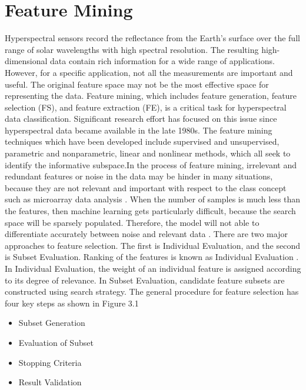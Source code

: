 \documentclass[document.tex]{subfiles}
\begin{document}
\section{Feature Mining}
Hyperspectral sensors record the reflectance from the Earth's surface over the full range of solar wavelengths with high spectral resolution. The resulting high-dimensional data contain rich information for a wide range of applications. However, for a specific application, not all the measurements are important and useful. The original feature space may not be the most effective space for representing the data. Feature mining, which includes feature generation, feature selection (FS), and feature extraction (FE)\cite{5}, is a critical task for hyperspectral data classification. Significant research effort has focused on this issue since hyperspectral data became available in the late 1980s. The feature mining techniques which have been developed include supervised and unsupervised, parametric and nonparametric, linear and nonlinear methods, which all seek to identify the informative subspace.In the process of feature mining, irrelevant and redundant features or noise in the data
may be hinder in many situations, because they are not relevant and important with respect to the class concept such as microarray data analysis . When the number of samples
is much less than the features, then machine learning gets particularly difficult, because
the search space will be sparsely populated. Therefore, the model will not able to differentiate accurately between noise and relevant data . There are two major approaches to
feature selection. The first is Individual Evaluation, and the second is Subset Evaluation.
Ranking of the features is known as Individual Evaluation . In Individual Evaluation,
the weight of an individual feature is assigned according to its degree of relevance. In
Subset Evaluation, candidate feature subsets are constructed using search strategy. The
general procedure for feature selection has four key steps as shown in Figure 3.1
\begin{itemize}
	\item Subset Generation
	\item Evaluation of Subset
	\item Stopping Criteria
	\item Result Validation
\end{itemize}
\end{document}
